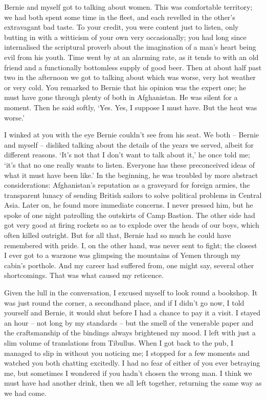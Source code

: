 Bernie and myself got to talking about women. This was comfortable territory; we had both spent some time in the fleet, and each revelled in the other's extravagant bad taste. To your credit, you were content just to listen, only butting in with a witticism of your own very occasionally; you had long since internalised the scriptural proverb about the imagination of a man's heart being evil from his youth. Time went by at an alarming rate, as it tends to with an old friend and a functionally bottomless supply of good beer. Then at about half past two in the afternoon we got to talking about which was worse, very hot weather or very cold. You remarked to Bernie that his opinion was the expert one; he must have gone through plenty of both in Afghanistan. He was silent for a moment. Then he said softly, `Yes. Yes, I suppose I must have. But the heat was worse.'

I winked at you with the eye Bernie couldn't see from his seat. We both -- Bernie and myself -- disliked talking about the details of the years we served, albeit for different reasons. `It's not that I don't want to talk about it,' he once told me; `it's that no one really wants to listen. Everyone has these preconceived ideas of what it must have been like.' In the beginning, he was troubled by more abstract considerations: Afghanistan's reputation as a graveyard for foreign armies, the transparent lunacy of sending British sailors to solve political problems in Central Asia. Later on, he found more immediate concerns. I never pressed him, but he spoke of one night patrolling the outskirts of Camp Bastion. The other side had got very good at firing rockets so as to explode over the heads of our boys, which often killed outright. But for all that, Bernie had so much he could have remembered with pride. I, on the other hand, was never sent to fight; the closest I ever got to a warzone was glimpsing the mountains of Yemen through my cabin's porthole. And my career had suffered from, one might say, several other shortcomings. That was what caused my reticence.

Given the lull in the conversation, I excused myself to look round a bookshop. It was just round the corner, a secondhand place, and if I didn't go now, I told yourself and Bernie, it would shut before I had a chance to pay it a visit. I stayed an hour -- not long by my standards -- but the smell of the venerable paper and the craftsmanship of the bindings always brightened my mood. I left with just a slim volume of translations from Tibullus. When I got back to the pub, I managed to slip in without you noticing me; I stopped for a few moments and watched you both chatting excitedly. I had no fear of either of you ever betraying me, but sometimes I wondered if you hadn't chosen the wrong man. I think we must have had another drink, then we all left together, returning the same way as we had come.

